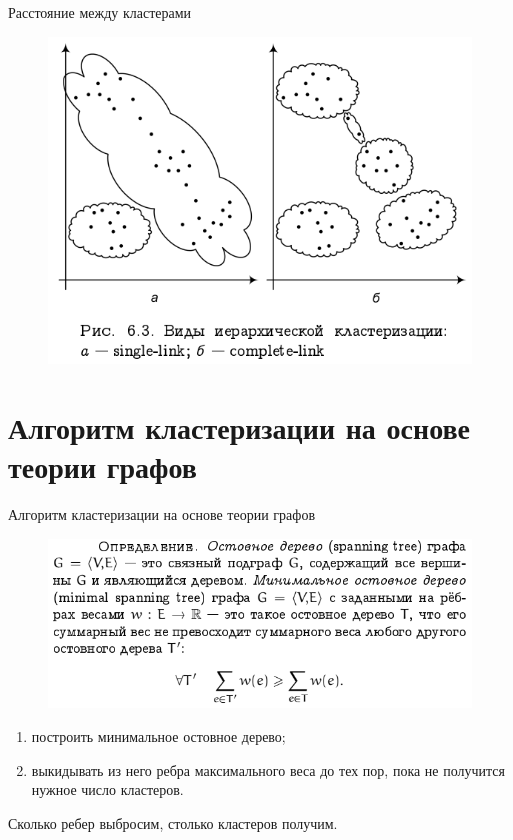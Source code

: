 \documentclass{beamer}
\begin{document}
\begin{frame}{Расстояние между кластерами}
\begin{figure}[h]
\centering
\includegraphics[scale=0.6]{images/lec07-pic18.png}
\end{figure}
\end{frame}

\section{Алгоритм кластеризации на основе теории графов}

\begin{frame}{Алгоритм кластеризации на основе теории графов}
\begin{figure}[h]
\centering
\includegraphics[scale=0.65]{images/lec07-pic19.png}
\end{figure}
\begin{enumerate}
\item построить минимальное остовное дерево;
\item выкидывать из него ребра максимального веса до тех пор, пока не получится нужное число кластеров. \end{enumerate}
Сколько ребер выбросим, столько кластеров получим.
\end{frame}
\end{document}
